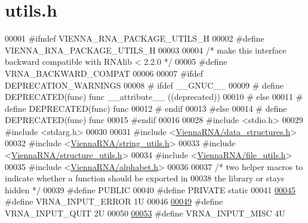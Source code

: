\hypertarget{utils_8h_source}{}\section{utils.\+h}
\label{utils_8h_source}

\begin{DoxyCode}
00001 \textcolor{preprocessor}{#ifndef VIENNA\_RNA\_PACKAGE\_UTILS\_H}
00002 \textcolor{preprocessor}{#define VIENNA\_RNA\_PACKAGE\_UTILS\_H}
00003 
00004 \textcolor{comment}{/* make this interface backward compatible with RNAlib < 2.2.0 */}
00005 \textcolor{preprocessor}{#define VRNA\_BACKWARD\_COMPAT}
00006 
00007 \textcolor{preprocessor}{#ifdef DEPRECATION\_WARNINGS}
00008 \textcolor{preprocessor}{# ifdef \_\_GNUC\_\_}
00009 \textcolor{preprocessor}{#  define DEPRECATED(func) func \_\_attribute\_\_ ((deprecated))}
00010 \textcolor{preprocessor}{# else}
00011 \textcolor{preprocessor}{#  define DEPRECATED(func) func}
00012 \textcolor{preprocessor}{# endif}
00013 \textcolor{preprocessor}{#else}
00014 \textcolor{preprocessor}{# define DEPRECATED(func) func}
00015 \textcolor{preprocessor}{#endif}
00016 
00028 \textcolor{preprocessor}{#include <stdio.h>}
00029 \textcolor{preprocessor}{#include <stdarg.h>}
00030 
00031 \textcolor{preprocessor}{#include <\hyperlink{data__structures_8h}{ViennaRNA/data\_structures.h}>}
00032 \textcolor{preprocessor}{#include <\hyperlink{string__utils_8h}{ViennaRNA/string\_utils.h}>}
00033 \textcolor{preprocessor}{#include <\hyperlink{structure__utils_8h}{ViennaRNA/structure\_utils.h}>}
00034 \textcolor{preprocessor}{#include <\hyperlink{file__utils_8h}{ViennaRNA/file\_utils.h}>}
00035 \textcolor{preprocessor}{#include <\hyperlink{alphabet_8h}{ViennaRNA/alphabet.h}>}
00036 
00037 \textcolor{comment}{/* two helper macros to indicate whether a function should be exported in}
00038 \textcolor{comment}{the library or stays hidden */}
00039 \textcolor{preprocessor}{#define PUBLIC}
00040 \textcolor{preprocessor}{#define PRIVATE static}
00041 
\hypertarget{utils_8h_source.tex_l00045}{}\hyperlink{group__utils_gad403c9ea58f1836689404c2931419c8c}{00045} \textcolor{preprocessor}{#define VRNA\_INPUT\_ERROR                  1U}
00046 
\hypertarget{utils_8h_source.tex_l00049}{}\hyperlink{group__utils_ga72f3c6ca5c83d2b9baed2922d19c403d}{00049} \textcolor{preprocessor}{#define VRNA\_INPUT\_QUIT                   2U}
00050 
\hypertarget{utils_8h_source.tex_l00053}{}\hyperlink{group__utils_ga8e3241b321c9c1a78a69e59e2e019a71}{00053} \textcolor{preprocessor}{#define VRNA\_INPUT\_MISC                   4U}

\end{DoxyCode}
